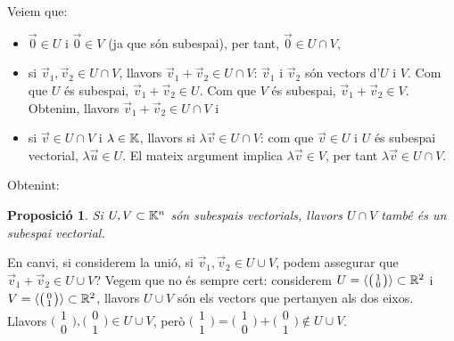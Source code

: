 \documentclass[
  11pt,
]{book}
\numberwithin{dummy}{section}
\theoremstyle{maincolornumbox}
\theoremstyle{blacknumex}
\theoremstyle{blacknumbox}
\theoremstyle{maincolornum}
\newtheorem{propositionT}{Proposició}[chapter]
\newenvironment{proposition}{\begin{pBox}\begin{propositionT}}{\end{propositionT}\end{pBox}}
\newlength\esp
\begin{document}
Veiem que:

\begin{itemize}
\item
  \(\vec 0\in U\) i \(\vec 0\in V\) (ja que són subespai), per tant,
  \(\vec 0\in U \cap V\),
\item
  si \(\vec v_1, \vec v_2 \in U\cap V\), llavors
  \(\vec v_1+\vec v_2 \in U\cap V\): \(\vec v_1\) i \(\vec v_2\) són vectors
  d'\(U\) i \(V\). Com que \(U\) és subespai, \(\vec v_1+\vec v_2 \in U\). Com
  que \(V\) és subespai, \(\vec v_1+\vec v_2 \in V\). Obtenim, llavors
  \(\vec v_1+\vec v_2 \in U\cap V\) i
\item
  si \(\vec v \in U\cap V\) i \(\lambda \in \mathbb{K}\), llavors si
  \(\lambda \vec v \in U\cap V\): com que \(\vec v \in U\) i \(U\) és
  subespai vectorial, \(\lambda \vec u\in U\). El mateix argument
  implica \(\lambda \vec v \in V\), per tant
  \(\lambda \vec v \in U\cap V\).
\end{itemize}

Obtenint:

\begin{proposition}
Si \(U,V\subset \mathbb{K}^n\) són subespais vectorials, llavors \(U\cap V\) també
és un subespai vectorial.
\end{proposition}

En canvi, si considerem la unió, si \(\vec v_1, \vec v_2 \in U\cup V\),
podem assegurar que \(\vec v_1+\vec v_2 \in U \cup V\)? Vegem que no és
sempre cert: considerem
\(U=\langle \big( \begin{smallmatrix} 1 \\ 0 \end{smallmatrix}\big) \rangle \subset \mathbb{R}^2\)
i
\(V=\langle \big( \begin{smallmatrix} 0 \\ 1 \end{smallmatrix}\big) \rangle\subset \mathbb{R}^2\),
llavors \(U\cup V\) són els vectors que pertanyen als dos eixos. Llavors
\(\big( \begin{smallmatrix} 1 \\ 0 \end{smallmatrix}\big), \big( \begin{smallmatrix} 0 \\ 1 \end{smallmatrix}\big)\in U\cup V\),
però
\(\big( \begin{smallmatrix} 1 \\ 1 \end{smallmatrix}\big)=\big( \begin{smallmatrix} 1 \\ 0 \end{smallmatrix}\big)+\big( \begin{smallmatrix} 0 \\ 1 \end{smallmatrix}\big) \not\in U\cup V\).
\end{document}
